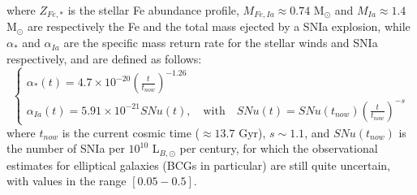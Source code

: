\documentclass{article}
\begin{document}
where $Z_{Fe,*}$ is the stellar Fe abundance profile, $M_{Fe,Ia}\approx 0.74$ M$_\odot$ and $M_{Ia}\approx 1.4$ M$_\odot$ are respectively the Fe and the total mass ejected by a SNIa explosion, while 
$\alpha_{*}$ and $\alpha_{Ia}$ are the specific mass return rate for the stellar winds and SNIa respectively, and are defined as follows:
\begin{equation}\label{rates}
	\begin{cases}
		\alpha_{*}(t)=4.7\times 10^{-20}(\frac{t}{t_{now}})^{-1.26}\\
		\alpha_{Ia}(t)=5.91\times 10^{-21} SNu(t), \quad \text{with}\quad SNu(t)=SNu(t_{now})(\frac{t}{t_{now}})^{-s}
	\end{cases}
\end{equation}
where $t_{now}$ is the current cosmic time ($\approx 13.7$ Gyr), $s\sim 1.1$, and $SNu(t_{now})$ is the number of SNIa per $10^{10}$ L$_{B,\odot}$ per century, for which the observational estimates for elliptical galaxies (BCGs in particular) are still quite uncertain, with values in the range $[0.05-0.5]$.\\
\end{document}
